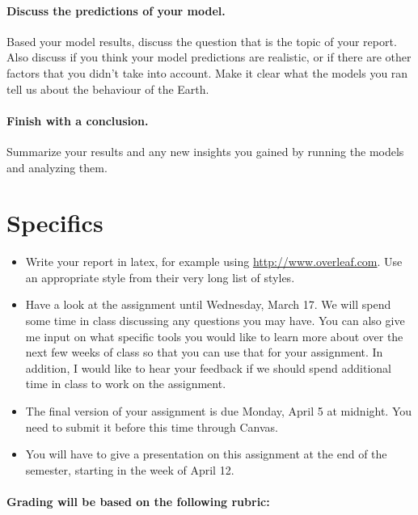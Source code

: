 \documentclass[notitlepage]{article}
\begin{document}
\paragraph{Discuss the predictions of your model.}

Based your model results, discuss the question that is the topic of your report.  
Also discuss if you think your model predictions are realistic, or if there are other factors that you didn't take into account. 
Make it clear what the models you ran tell us about the behaviour of the Earth. 

\paragraph{Finish with a conclusion.}
Summarize your results and any new insights you gained by running the models and analyzing them. 

\section{Specifics}

\begin{itemize}
\item Write your report in latex, for example using \url{http://www.overleaf.com}.  Use an appropriate style from their very long list of styles. 
\item Have a look at the assignment until Wednesday, March 17. We will spend some time in class discussing any questions you may have. You can also give me input on what specific tools you would like to learn more about over the next few weeks of class so that you can use that for your assignment. In addition, I would like to hear your feedback if we should spend additional time in class to work on the assignment. 
\item The final version of your assignment is due Monday, April 5 at midnight. You need to submit it before this time through Canvas. 
\item You will have to give a presentation on this assignment at the end of the semester, starting in the week of April 12. 
\end{itemize}

\paragraph{Grading will be based on the following rubric:}
\end{document}
